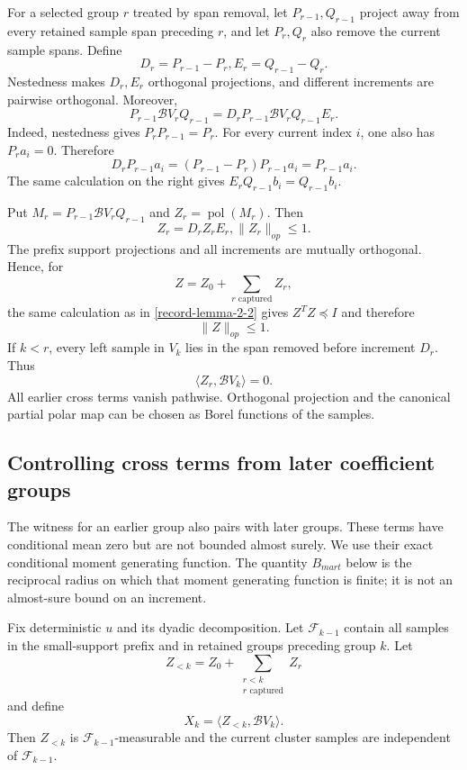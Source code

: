 \documentclass[11pt]{article}
\numberwithin{equation}{section}
\theoremstyle{definition}
\theoremstyle{remark}
\newcommand{\1}{\boldsymbol 1}
\begin{document}
\begin{aiblock}
For a selected group $r$ treated by span removal, let
$P_{r-1},Q_{r-1}$ project away from every retained sample
span preceding $r$, and let $P_r,Q_r$ also remove the
current sample spans. Define
\[
  D_r=P_{r-1}-P_r, E_r=Q_{r-1}-Q_r.
\]
Nestedness makes $D_r,E_r$ orthogonal projections, and
different increments are pairwise orthogonal. Moreover,
\[
  P_{r-1}\mathcal{B}V_rQ_{r-1} =
  D_rP_{r-1}\mathcal{B}V_rQ_{r-1}E_r.
\]
Indeed, nestedness gives $P_rP_{r-1}=P_r$. For every
current index $i$, one also has $P_ra_i=0$. Therefore
\[
  D_rP_{r-1}a_i=(P_{r-1}-P_r)P_{r-1}a_i=P_{r-1}a_i.
\]
The same calculation on the right gives
$E_rQ_{r-1}b_i=Q_{r-1}b_i$.

Put $M_r=P_{r-1}\mathcal{B}V_rQ_{r-1}$ and
$Z_r=\operatorname{pol}(M_r)$. Then
\[
  Z_r=D_rZ_rE_r, \|Z_r\|_{op}\le1.
\]
The prefix support projections and all increments are
mutually orthogonal. Hence, for
\[
  Z=Z_0+\sum_{r\text{ captured}}Z_r,
\]
the same calculation as in \cref{record-lemma-2-2} gives
$Z^TZ\preceq I$ and therefore
\[
  \|Z\|_{op}\le1.
\]
If $k<r$, every left sample in $V_k$ lies in the span
removed before increment $D_r$. Thus
\[
  \langle Z_r,\mathcal{B}V_k\rangle=0.
\]
All earlier cross terms vanish pathwise. Orthogonal
projection and the canonical partial polar map can be
chosen as Borel functions of the samples.

\subsection{Controlling cross terms from later
  coefficient groups}\label{future-cross-term-supermartingale}

The witness for an earlier group also pairs with later
groups. These terms have conditional mean zero but are
not bounded almost surely. We use their exact conditional
moment generating function. The quantity $B_{mart}$ below
is the reciprocal radius on which that moment generating
function is finite; it is not an almost-sure bound on an
increment.

Fix deterministic $u$ and its dyadic decomposition. Let
$\mathcal{F}_{k-1}$ contain all samples in the
small-support prefix and in retained groups preceding
group $k$. Let
\[
  Z_{<k}=Z_0+\sum_{\substack{r<k\\r\text{ captured}}}Z_r
\]
and define
\[
  X_k=\langle Z_{<k},\mathcal{B}V_k\rangle.
\]
Then $Z_{<k}$ is $\mathcal{F}_{k-1}$-measurable and the
current cluster samples are independent of
$\mathcal{F}_{k-1}$.


\end{aiblock}
\end{document}
